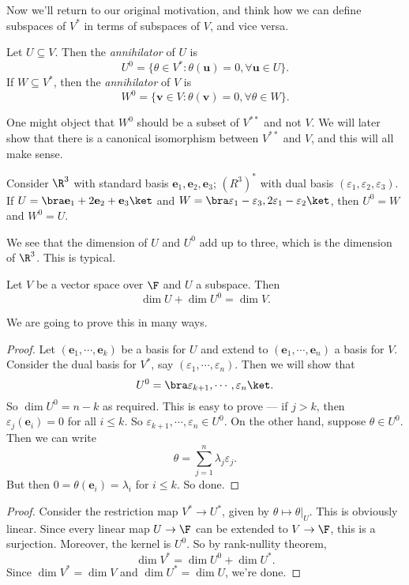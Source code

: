 \documentclass[a4paper]{article}
\begin{document}
Now we'll return to our original motivation, and think how we can define subspaces of $V^*$ in terms of subspaces of $V$, and vice versa.

\begin{defi}[Annihilator]
  Let $U\subseteq V$. Then the \emph{annihilator} of $U$ is
  \[
    U^0 = \{\theta\in V^* : \theta(\mathbf{u}) = 0, \forall \mathbf{u}\in U\}.
  \]
  If $W \subseteq V^*$, then the \emph{annihilator} of $V$ is
  \[
    W^0 = \{\mathbf{v}\in V: \theta(\mathbf{v}) = 0,\forall \theta \in W\}.
  \]
\end{defi}
One might object that $W^0$ should be a subset of $V^{**}$ and not $V$. We will later show that there is a canonical isomorphism between $V^{**}$ and $V$, and this will all make sense.

\begin{eg}
  Consider $\R^3$ with standard basis $\mathbf{e}_1, \mathbf{e}_2, \mathbf{e}_3$; $(R^3)^*$ with dual basis $(\varepsilon_1, \varepsilon_2, \varepsilon_3)$. If $U = \bra \mathbf{e}_1 + 2\mathbf{e}_2 + \mathbf{e}_3\ket$ and $W = \bra \varepsilon_1 - \varepsilon_3, 2\varepsilon_1 - \varepsilon_2\ket $, then $U^0 = W$ and $W^0 = U$.
\end{eg}
We see that the dimension of $U$ and $U^0$ add up to three, which is the dimension of $\R^3$. This is typical.

\begin{prop}
  Let $V$ be a vector space over $\F$ and $U$ a subspace. Then
  \[
    \dim U + \dim U^0 = \dim V.
  \]
\end{prop}
We are going to prove this in many ways.
\begin{proof}
  Let $(\mathbf{e}_1, \cdots, \mathbf{e}_k)$ be a basis for $U$ and extend to $(\mathbf{e}_1, \cdots, \mathbf{e}_n)$ a basis for $V$. Consider the dual basis for $V^*$, say $(\varepsilon_1, \cdots, \varepsilon_n)$. Then we will show that
  \[
    U^0 = \bra \varepsilon_{k + 1}, \cdots,  \varepsilon_{n}\ket.
  \]
  So $\dim U^0 = n - k$ as required. This is easy to prove --- if $j > k$, then $\varepsilon_j(\mathbf{e}_i) = 0$ for all $ i \leq k$. So $\varepsilon_{k + 1}, \cdots, \varepsilon_n \in U^0$. On the other hand, suppose $\theta \in U^0$. Then we can write
  \[
    \theta = \sum_{j = 1}^n \lambda_j \varepsilon_j.
  \]
  But then $0 = \theta (\mathbf{e}_i) = \lambda_i$ for $i \leq k$. So done.
\end{proof}

\begin{proof}
  Consider the restriction map $V^* \to U^*$, given by $\theta \mapsto \theta|_U$. This is obviously linear. Since every linear map $U \to \F$ can be extended to $V\to \F$, this is a surjection. Moreover, the kernel is $U^0$. So by rank-nullity theorem,
  \[
    \dim V^* = \dim U^0 + \dim U^*.
  \]
  Since $\dim V^* = \dim V$ and $\dim U^* = \dim U$, we're done.
\end{proof}
\end{document}
